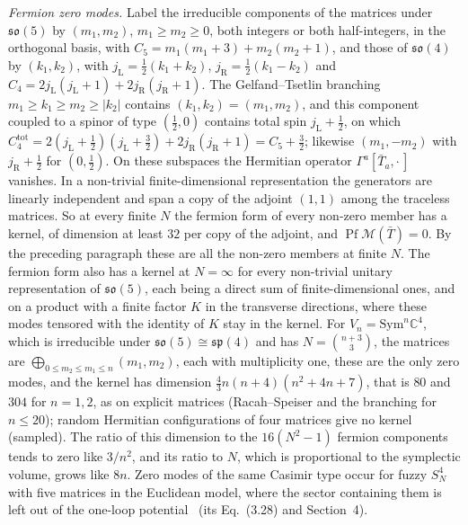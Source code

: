 \emph{Fermion zero modes.} Label the irreducible components of the matrices under \(\mathfrak{so}(5)\) by \((m_1,m_2)\), \(m_1\ge m_2\ge0\), both integers or both half-integers, in the orthogonal basis, with \(C_5=m_1(m_1+3)+m_2(m_2+1)\), and those of \(\mathfrak{so}(4)\) by \((k_1,k_2)\), with \(j_{\mathrm L}=\tfrac12(k_1+k_2)\), \(j_{\mathrm R}=\tfrac12(k_1-k_2)\) and \(C_4=2j_{\mathrm L}(j_{\mathrm L}+1)+2j_{\mathrm R}(j_{\mathrm R}+1)\). The Gelfand--Tsetlin branching \(m_1\ge k_1\ge m_2\ge|k_2|\) contains \((k_1,k_2)=(m_1,m_2)\), and this component coupled to a spinor of type \((\tfrac12,0)\) contains total spin \(j_{\mathrm L}+\tfrac12\), on which \(C_4^{\mathrm{tot}}=2(j_{\mathrm L}+\tfrac12)(j_{\mathrm L}+\tfrac32)+2j_{\mathrm R}(j_{\mathrm R}+1)=C_5+\tfrac32\); likewise \((m_1,-m_2)\) with \(j_{\mathrm R}+\tfrac12\) for \((0,\tfrac12)\). On these subspaces the Hermitian operator \(\Gamma^a[\bar T_a,\cdot\,]\) vanishes. In a non-trivial finite-dimensional representation the generators are linearly independent and span a copy of the adjoint \((1,1)\) among the traceless matrices. So at every finite \(N\) the fermion form of every non-zero member has a kernel, of dimension at least \(32\) per copy of the adjoint, and \(\operatorname{Pf}\mathcal M(\bar T)=0\). By the preceding paragraph these are all the non-zero members at finite \(N\). The fermion form also has a kernel at \(N=\infty\) for every non-trivial unitary representation of \(\mathfrak{so}(5)\), each being a direct sum of finite-dimensional ones, and on a product with a finite factor \(K\) in the transverse directions, where these modes tensored with the identity of \(K\) stay in the kernel. For \(V_n=\mathrm{Sym}^n\mathbb C^4\), which is irreducible under \(\mathfrak{so}(5)\cong\mathfrak{sp}(4)\) and has \(N=\binom{n+3}3\), the matrices are \(\bigoplus_{0\le m_2\le m_1\le n}(m_1,m_2)\), each with multiplicity one, these are the only zero modes, and the kernel has dimension \(\tfrac43n(n+4)(n^2+4n+7)\), that is \(80\) and \(304\) for \(n=1,2\), as on explicit matrices (Racah--Speiser and the branching for \(n\le20\)); random Hermitian configurations of four matrices give no kernel (sampled). The ratio of this dimension to the \(16(N^2-1)\) fermion components tends to zero like \(3/n^2\), and its ratio to \(N\), which is proportional to the symplectic volume, grows like \(8n\). Zero modes of the same Casimir type occur for fuzzy \(S^4_N\) with five matrices in the Euclidean model, where the sector containing them is left out of the one-loop potential~\cite{Steinacker2015S4} (its Eq.~(3.28) and Section~4).

